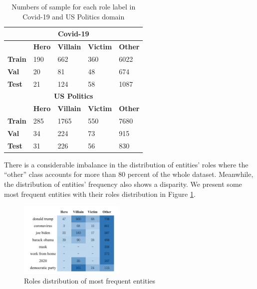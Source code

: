 \documentclass[11pt]{article}
\begin{document}
\begin{table}[h]
\centering
\begin{tabular}{lllll}
\hline
\multicolumn{5}{c}{\textbf{Covid-19}}                                                \\ \hline
               & \textbf{Hero} & \textbf{Villain} & \textbf{Victim} & \textbf{Other} \\
\textbf{Train} & 190           & 662              & 360             & 6022           \\
\textbf{Val}   & 20            & 81               & 48              & 674            \\
\textbf{Test}  & 21            & 124              & 58              & 1087           \\ \hline
\multicolumn{5}{c}{\textbf{US Politics}}                                             \\ \hline
\textbf{}      & \textbf{Hero} & \textbf{Villain} & \textbf{Victim} & \textbf{Other} \\
\textbf{Train} & 285           & 1765             & 550             & 7680           \\
\textbf{Val}   & 34            & 224              & 73              & 915            \\
\textbf{Test}  & 31            & 226              & 56              & 830           \\ \hline   
\end{tabular}
\caption{\label{dataset-table}Numbers of sample for each role label in Covid-19 and US Politics domain }

\end{table}

There is a considerable imbalance in the distribution of entities' roles where the “other” class accounts for more than 80 percent of the whole dataset. Meanwhile, the distribution of entities' frequency also shows a disparity. We present some most frequent entities with their roles distribution in Figure \ref{Entitites}.

\begin{figure}[h]
\includegraphics[width=0.45\textwidth]{Entitites.pdf}
\caption{\label{Entitites}Roles distribution of most frequent entities}

\end{figure}
\end{document}
